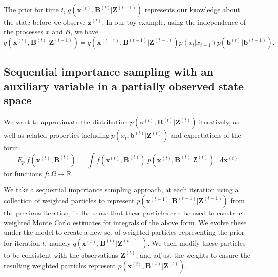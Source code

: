 \documentclass[11pt,a4paper]{article}
\newcommand{\Real}{\mathbb R}
\renewcommand{\vec}[1]{\mathbf{#1}}
\newcommand*\diff{\mathop{}\!\mathrm{d}}
\begin{document}
The prior for time $t$, $q(\vec{x}^{(t)},\vec{B}^{(t)} | \vec{Z}^{(t-1)})$ represents our knowledge about the state before we observe $\vec{z}^{(t)}$. In our toy example, using the independence of the processes $x$ and $B$, we have
\begin{equation}
q(\vec{x}^{(t)},\vec{B}^{(t)} | \vec{Z}^{(t-1)}) = q(\vec{x}^{(t-1)},\vec{B}^{(t-1)} | \vec{Z}^{(t-1)}) p(x_t | x_{t-1}) p(\vec{b}^{(t)} | \vec{b}^{(t-1)}).
\end{equation}





\subsection{Sequential importance sampling with an auxiliary variable in a partially observed state space}

We want to approximate the distribution $p(\vec{x}^{(t)}, \vec{B}^{(t)} | \vec{Z}^{(t)})$ iteratively, as well as related properties including $p(x_{t}, \vec{b}^{(t)} | \vec{Z}^{(t)})$ and expectations of the form:
\[
E_{p} \Big[f(\vec{x}^{(t)}, \vec{B}^{(t)}) \Big] = \int f(\vec{x}^{(t)}, \vec{B}^{(t)})\; p(\vec{x}^{(t)}, \vec{B}^{(t)} | \vec{Z}^{(t)})\; \diff \vec{x}^{(t)}
\]
for functions $f: \Omega  \rightarrow \Real$. 

We take a sequential importance sampling approach, at each iteration using a collection of weighted particles to represent $p(\vec{x}^{(t-1)}, \vec{B}^{(t-1)} | \vec{Z}^{(t-1)})$ from the previous iteration, in the sense that these particles can be used to construct weighted Monte Carlo estimates for integrals of the above form. We evolve these under the model to create a new set of weighted particles representing the prior for iteration $t$, namely $q(\vec{x}^{(t)}, \vec{B}^{(t)} | \vec{Z}^{(t-1)})$. We then modify these particles to be consistent with the observations $\vec{Z}^{(t)}$, and adjust the weights to ensure the resulting weighted particles represent $p(\vec{x}^{(t)}, \vec{B}^{(t)} | \vec{Z}^{(t)})$.
\end{document}
